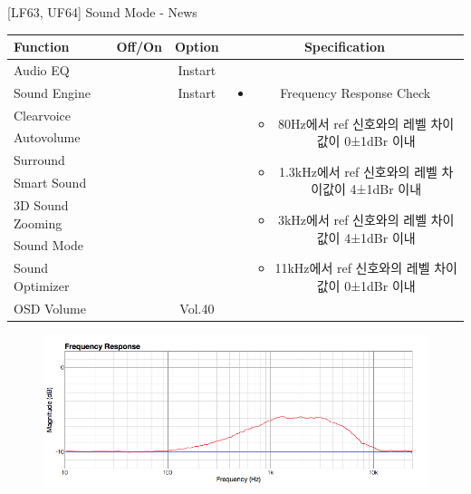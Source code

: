 \begin{frame}[t]{[LF63, UF64] Sound Mode - News}
\begin{tiny}
\begin{tabular}{@{}lccc@{}}
\toprule
Function & Off/On & Option & Specification \\
\midrule
Audio EQ & \color{black}{Off} & Instart &
\multirow{10}{60mm}{
\begin{itemize}
\item Frequency Response Check
	\begin{itemize}
	\item 80Hz에서 ref 신호와의 레벨 차이값이 0±1dBr 이내
	\item 1.3kHz에서 ref 신호와의 레벨 차이값이 4±1dBr 이내
	\item 3kHz에서 ref 신호와의 레벨 차이값이 4±1dBr 이내
	\item 11kHz에서 ref 신호와의 레벨 차이값이 0±1dBr 이내
	\end{itemize}
\end{itemize}
} \\
Sound Engine & \color{blue}{On} & Instart & \\
Clearvoice & \color{black}{Off} & & \\
Autovolume & \color{black}{Off} & & \\
Surround & \color{black}{Off} & & \\
Smart Sound & \color{black}{Off} & & \\
3D Sound Zooming & \color{black}{Off} & & \\
Sound Mode & \color{blue}{On} & \color{blue}{News} & \\
Sound Optimizer & \color{black}{Off} & & \\
OSD Volume & \color{blue}{On} & Vol.40 & \\
\midrule
\end{tabular}
\end{tiny}

\begin{figure}[b]
\includegraphics[height=0.4\textwidth]{figures/news.png}
\end{figure}

\end{frame}
